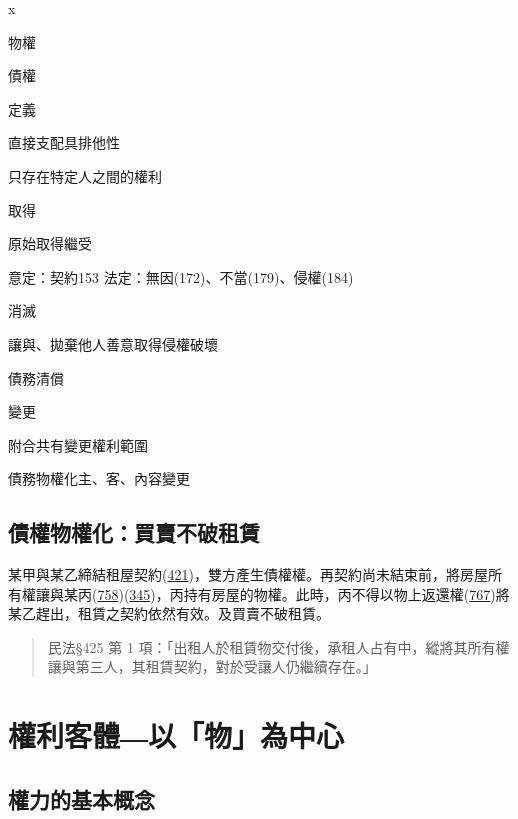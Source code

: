 \documentclass[
]{book}
\begin{document}
x

物權

債權

定義

直接支配具排他性

只存在特定人之間的權利

取得

原始取得繼受

意定：契約153
法定：無因(172)、不當(179)、侵權(184)

消滅

讓與、拋棄他人善意取得侵權破壞

債務清償

變更

附合共有變更權利範圍

債務物權化主、客、內容變更

\hypertarget{ux50b5ux6b0aux7269ux6b0aux5316ux8cb7ux8ce3ux4e0dux7834ux79dfux8cc3}{%
\section{債權物權化：買賣不破租賃}\label{ux50b5ux6b0aux7269ux6b0aux5316ux8cb7ux8ce3ux4e0dux7834ux79dfux8cc3}}

某甲與某乙締結租屋契約(\href{https://law.moj.gov.tw/LawClass/LawSingle.aspx?pcode=B0000001\&flno=421}{421})，雙方產生債權權。再契約尚未結束前，將房屋所有權讓與某丙(\href{https://law.moj.gov.tw/LawClass/LawSingle.aspx?pcode=B0000001\&flno=758}{758})(\href{https://law.moj.gov.tw/LawClass/LawSingle.aspx?pcode=B0000001\&flno=345}{345})，丙持有房屋的物權。此時，丙不得以物上返還權(\href{https://law.moj.gov.tw/LawClass/LawSingle.aspx?pcode=B0000001\&flno=767}{767})將某乙趕出，租賃之契約依然有效。及買賣不破租賃。

\begin{quote}
民法§425 第 1 項：「出租人於租賃物交付後，承租人占有中，縱將其所有權讓與第三人，其租賃契約，對於受讓人仍繼續存在。」
\end{quote}

\hypertarget{ux6b0aux5229ux5ba2ux9ad4ux4ee5ux7269ux70baux4e2dux5fc3}{%
\chapter{權利客體―以「物」為中心}\label{ux6b0aux5229ux5ba2ux9ad4ux4ee5ux7269ux70baux4e2dux5fc3}}

\hypertarget{ux6b0aux529bux7684ux57faux672cux6982ux5ff5}{%
\section{權力的基本概念}\label{ux6b0aux529bux7684ux57faux672cux6982ux5ff5}}
\end{document}
